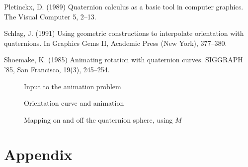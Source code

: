 \begin{thebibliography}{Shoemake 85}
Pletinckx, D. (1989) Quaternion calculus as a basic tool in computer graphics.
The Visual Computer 5, 2--13.

Schlag, J. (1991) Using geometric constructions to interpolate
orientation with quaternions.  In Graphics Gems II, Academic Press (New York),
377--380.


Shoemake, K. (1985) Animating rotation with quaternion curves.
SIGGRAPH '85, San Francisco, 19(3), 245--254.

\end{thebibliography}

\onecolumn

\begin{figure}
\vspace{3in}
\caption{Input to the animation problem}
\label{fig:input}
\end{figure}

\begin{figure*}
\vspace{4in}
\caption{Orientation curve and animation}
\label{fig:output}
\end{figure*}

\begin{figure}
\vspace{3.5in}
\caption{Mapping on and off the quaternion sphere, using $M$}
\label{fig:method}
\end{figure}

\ifFull %
\section{Appendix}


